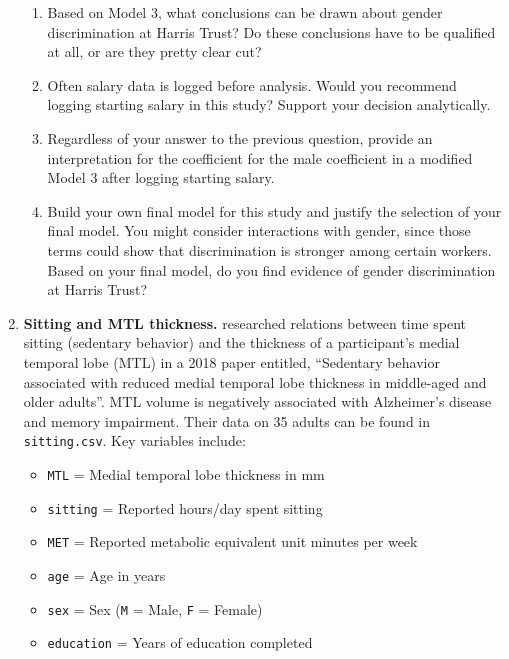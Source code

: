 \documentclass[
]{krantz}
\providecommand{\tightlist}{%
  \setlength{\itemsep}{0pt}\setlength{\parskip}{0pt}}
\begin{document}
\begin{enumerate}
\begin{enumerate}
  \item
    Based on Model 3, what conclusions can be drawn about gender discrimination at Harris Trust? Do these conclusions have to be qualified at all, or are they pretty clear cut?
  \item
    Often salary data is logged before analysis. Would you recommend logging starting salary in this study? Support your decision analytically.
  \item
    Regardless of your answer to the previous question, provide an interpretation for the coefficient for the male coefficient in a modified Model 3 after logging starting salary.
  \item
    Build your own final model for this study and justify the selection of your final model. You might consider interactions with gender, since those terms could show that discrimination is stronger among certain workers. Based on your final model, do you find evidence of gender discrimination at Harris Trust?\\
  \end{enumerate}
\item
  \textbf{Sitting and MTL thickness.} \citet{Siddarth2018} researched relations between time spent sitting (sedentary behavior) and the thickness of a participant's medial temporal lobe (MTL) in a 2018 paper entitled, ``Sedentary behavior associated with reduced medial temporal lobe thickness in middle-aged and older adults''. MTL volume is negatively associated with Alzheimer's disease and memory impairment. Their data on 35 adults can be found in \texttt{sitting.csv}. Key variables include:

  \begin{itemize}
  \tightlist
  \item
    \texttt{MTL} = Medial temporal lobe thickness in mm
  \item
    \texttt{sitting} = Reported hours/day spent sitting
  \item
    \texttt{MET} = Reported metabolic equivalent unit minutes per week
  \item
    \texttt{age} = Age in years
  \item
    \texttt{sex} = Sex (\texttt{M} = Male, \texttt{F} = Female)
  \item
    \texttt{education} = Years of education completed
  \end{itemize}


\end{enumerate}
\end{document}
